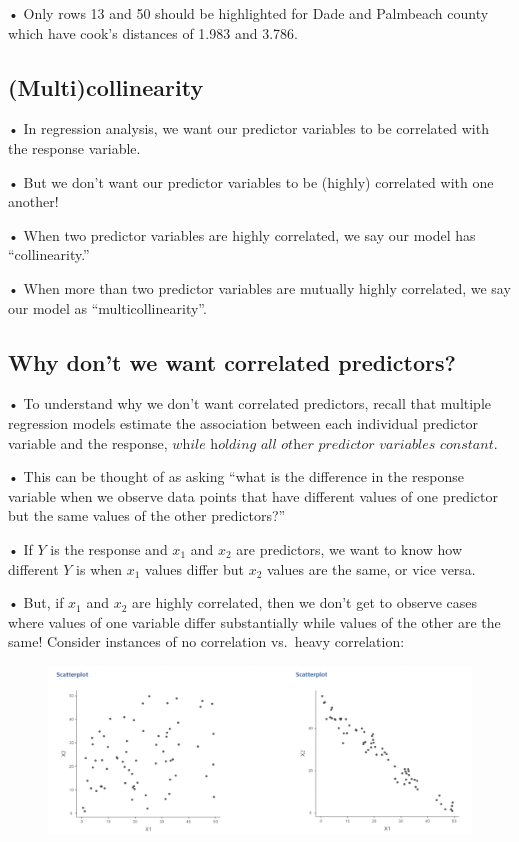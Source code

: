 \documentclass[
  letterpaper,
  DIV=11,
  numbers=noendperiod]{scrreprt}
\begin{document}
• Only rows 13 and 50 should be highlighted for Dade and Palmbeach
county which have cook's distances of 1.983 and 3.786.

\hypertarget{multicollinearity}{%
\subsection{(Multi)collinearity}\label{multicollinearity}}

• In regression analysis, we want our predictor variables to be
correlated with the response variable.

• But we don't want our predictor variables to be (highly) correlated
with one another!

• When two predictor variables are highly correlated, we say our model
has ``collinearity.''

• When more than two predictor variables are mutually highly correlated,
we say our model as ``multicollinearity''.

\hypertarget{why-dont-we-want-correlated-predictors}{%
\subsection{Why don't we want correlated
predictors?}\label{why-dont-we-want-correlated-predictors}}

• To understand why we don't want correlated predictors, recall that
multiple regression models estimate the association between each
individual predictor variable and the response,
\(\textit{while holding all other predictor variables constant}\).

• This can be thought of as asking ``what is the difference in the
response variable when we observe data points that have different values
of one predictor but the same values of the other predictors?''

• If \(Y\) is the response and \(x_1\) and \(x_2\) are predictors, we
want to know how different \(Y\) is when \(x_1\) values differ but
\(x_2\) values are the same, or vice versa.

• But, if \(x_1\) and \(x_2\) are highly correlated, then we don't get
to observe cases where values of one variable differ substantially while
values of the other are the same! Consider instances of no correlation
vs.~heavy correlation:

\begin{figure}

{\centering \includegraphics{images/mod4_pt1_21.png}

}

\end{figure}
\end{document}
